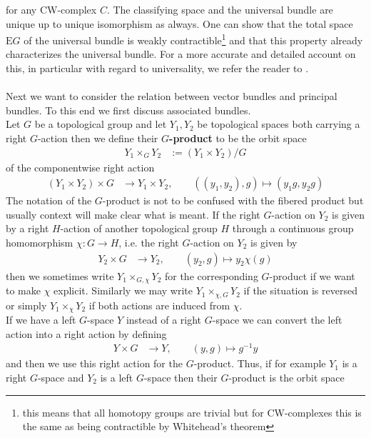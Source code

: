 for any CW-complex $C$. The classifying space and the universal bundle are unique up to unique isomorphism as always. One can show that the total space $\mathrm{E}G$ of the universal bundle is weakly contractible\footnote{this means that all homotopy groups are trivial but for CW-complexes this is the same as being contractible by Whitehead's theorem} and that this property already characterizes the universal bundle. For a more accurate and detailed account on this, in particular with regard to universality, we refer the reader to \cite{00000001}.
\\\\
Next we want to consider the relation between vector bundles and principal bundles. To this end we first discuss associated bundles.
\\
Let $G$ be a topological group and let $Y_{1},Y_{2}$ be topological spaces both carrying a right $G$-action then we define their \textbf{$G$-product} to be the orbit space
\begin{align*}
  Y_{1} \times_{G} Y_{2}
  &:=
  (Y_{1} \times Y_{2})/G
\end{align*}
of the componentwise right action
\begin{align*}
  (Y_{1} \times Y_{2})
  \times
  G
  &\to
  Y_{1} \times Y_{2}
  ,\qquad
  ((y_{1},y_{2}),g)
  \mapsto
  (y_{1}g,y_{2}g)
\end{align*}
The notation of the $G$-product is not to be confused with the fibered product but usually context will make clear what is meant. If the right $G$-action on $Y_{2}$ is given by a right $H$-action of another topological group $H$ through a continuous group homomorphism $\chi \colon G \to H$, i.e. the right $G$-action on $Y_{2}$ is given by
\begin{align*}
  Y_{2} \times G
  &\to
  Y_{2}
  ,\qquad
  (y_{2},g)
  \mapsto
  y_{2}\chi(g)
\end{align*}
then we sometimes write $Y_{1} \times_{G,\chi} Y_{2}$ for the corresponding $G$-product if we want to make $\chi$ explicit. Similarly we may write $Y_{1} \times_{\chi,G} Y_{2}$ if the situation is reversed or simply $Y_{1} \times_{\chi} Y_{2}$ if both actions are induced from $\chi$.
\\
If we have a left $G$-space $Y$ instead of a right $G$-space we can convert the left action into a right action by defining
\begin{align*}
  Y \times G
  &\to
  Y
  ,\qquad
  (y,g)
  \mapsto
  g^{-1}y
\end{align*}
and then we use this right action for the $G$-product. Thus, if for example $Y_{1}$ is a right $G$-space and $Y_{2}$ is a left $G$-space then their $G$-product is the orbit space
